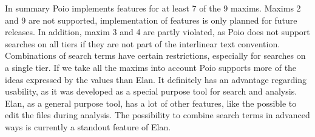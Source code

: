 In summary Poio implements features for at least 7 of the 9 maxims. Maxims 2 and 9 are not supported, implementation of features is only planned for future releases. In addition, maxim 3 and 4 are partly violated, as Poio does not support searches on all tiers if they are not part of the interlinear text convention. Combinations of search terms have certain restrictions, especially for searches on a single tier. If we take all the maxims into account Poio supports more of the ideas expressed by the values than Elan. It definitely has an advantage regarding usability, as it was developed as a special purpose tool for search and analysis. Elan, as a general purpose tool, has a lot of other features, like the possible to edit the files during analysis. The possibility to combine search terms in advanced ways is currently a standout feature of Elan.


\nocite{HartmannEtAl2009hocank}